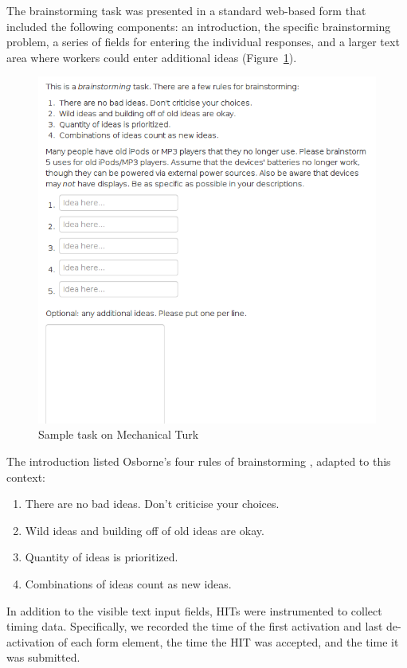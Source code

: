 The brainstorming task was presented in a standard web-based form that included the following components: an introduction, the specific brainstorming problem, a series of fields for entering the individual responses, and a larger text area where workers could enter additional ideas (Figure~\ref{fig:sample_task}).

\begin{figure}[h!]
    \centering
    \includegraphics[width=0.9\columnwidth]{sample_task}
    \caption{Sample task on Mechanical Turk}
    \label{fig:sample_task}
\end{figure}

The introduction listed Osborne's four rules of brainstorming \cite{osborn_applied_1957}, adapted to this context:

\begin{enumerate}
\item There are no bad ideas. Don't criticise your choices.
\item Wild ideas and building off of old ideas are okay.
\item Quantity of ideas is prioritized.
\item Combinations of ideas count as new ideas.
\end{enumerate}

In addition to the visible text input fields, HITs were instrumented to collect timing data. Specifically, we recorded the time of the first activation and last de-activation of each form element, the time the HIT was accepted, and the time it was submitted.


